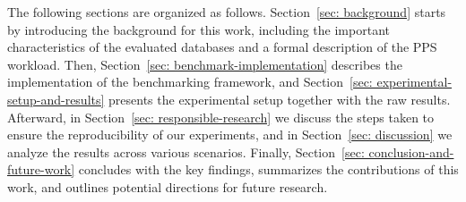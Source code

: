 The following sections are organized as follows. Section~\ref{sec: background} starts by introducing the background for this work, including the important characteristics of the evaluated databases and a formal description of the PPS workload. Then, Section~\ref{sec: benchmark-implementation} describes the implementation of the benchmarking framework, and Section~\ref{sec: experimental-setup-and-results} presents the experimental setup together with the raw results. Afterward, in Section~\ref{sec: responsible-research} we discuss the steps taken to ensure the reproducibility of our experiments, and in Section~\ref{sec: discussion} we analyze the results across various scenarios. Finally, Section~\ref{sec: conclusion-and-future-work} concludes with the key findings, summarizes the contributions of this work, and outlines potential directions for future research.